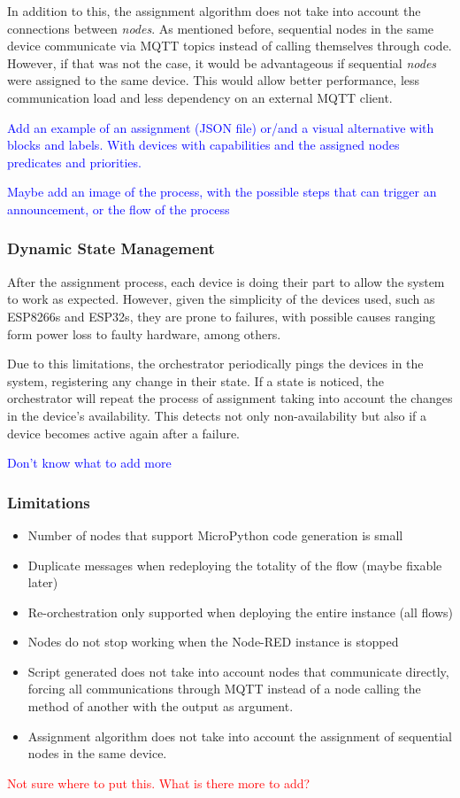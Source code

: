 In addition to this, the assignment algorithm does not take into account the connections between \textit{nodes}. As mentioned before, sequential nodes in the same device communicate via MQTT topics instead of calling themselves through code. However, if that was not the case, it would be advantageous if sequential \textit{nodes} were assigned to the same device. This would allow better performance, less communication load and less dependency on an external MQTT client.

\textcolor{blue}{Add an example of an assignment (JSON file) or/and a visual alternative with blocks and labels. With devices with capabilities and the assigned nodes predicates and priorities.}

\textcolor{blue}{Maybe add an image of the process, with the possible steps that can trigger an announcement, or the flow of the process}

\subsubsection{Dynamic State Management}\label{sec:dynamic_state_management}


After the assignment process, each device is doing their part to allow the system to work as expected. However, given the simplicity of the devices used, such as ESP8266s and ESP32s, they are prone to failures, with possible causes ranging form power loss to faulty hardware, among others.

Due to this limitations, the orchestrator periodically pings the devices in the system, registering any change in their state. If a state is noticed, the orchestrator will repeat the process of assignment taking into account the changes in the device's availability. This detects not only non-availability but also if a device becomes active again after a failure.

\textcolor{blue}{Don't know what to add more}

\subsubsection{Limitations}\label{sec:limitations}

\begin{itemize}
    \item Number of nodes that support MicroPython code generation is small
    \item Duplicate messages when redeploying the totality of the flow (maybe fixable later)
    \item Re-orchestration only supported when deploying the entire instance (all flows)
    \item Nodes do not stop working when the Node-RED instance is stopped
    \item Script generated does not take into account nodes that communicate directly, forcing all communications through MQTT instead of a node calling the method of another with the output as argument.
    \item Assignment algorithm does not take into account the assignment of sequential nodes in the same device.
\end{itemize}

\textcolor{red}{Not sure where to put this. What is there more to add?}